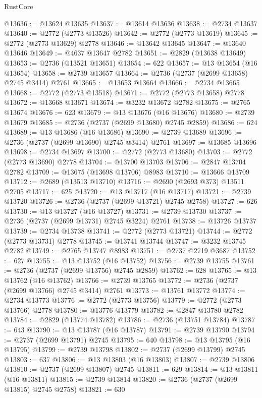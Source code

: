 \begin{lexlean}{RustCore}
\begin{coremodule}
@13636 := @13624 @13635
@13637 := @13614 @13636
@13638 := @2734 @13637
@13640 := @2772 (@2773 @13526)
@13642 := @2772 (@2773 @13619)
@13645 := @2772 (@2773 @13629) @2778
@13646 := @13642 @13645
@13647 := @13640 @13646
@13649 := @4637 @13647 @2782
@13651 := @2829 (@13638 @13649)
@13653 := @2736 (@13521 @13651)
@13654 := 622
@13657 := @13 @13654 (@16 @13654)
@13658 := @2739 @13657
@13664 := @2736 (@2737 (@2699 @13658) @2745 @3414) @2761
@13665 := @13653 @13664
@13666 := @2734 @13665
@13668 := @2772 (@2773 @13518)
@13671 := @2772 (@2773 @13658) @2778
@13672 := @13668 @13671
@13674 := @3232 @13672 @2782
@13675 := @2765 @13674
@13676 := 623
@13679 := @13 @13676 (@16 @13676)
@13680 := @2739 @13679
@13685 := @2736 (@2737 (@2699 @13680) @2745 @2859)
@13686 := 624
@13689 := @13 @13686 (@16 @13686)
@13690 := @2739 @13689
@13696 := @2736 (@2737 (@2699 @13690) @2745 @3414) @2761
@13697 := @13685 @13696
@13698 := @2734 @13697
@13700 := @2772 (@2773 @13680)
@13703 := @2772 (@2773 @13690) @2778
@13704 := @13700 @13703
@13706 := @2847 @13704 @2782
@13709 := @13675 (@13698 @13706) @8983
@13710 := @13666 @13709
@13712 := @2689 (@13513 @13710)
@13716 := @2690 (@2693 @373) @13511 @2705
@13717 := 625
@13720 := @13 @13717 (@16 @13717)
@13721 := @2739 @13720
@13726 := @2736 (@2737 (@2699 @13721) @2745 @2758)
@13727 := 626
@13730 := @13 @13727 (@16 @13727)
@13731 := @2739 @13730
@13737 := @2736 (@2737 (@2699 @13731) @2745 @3224) @2761
@13738 := @13726 @13737
@13739 := @2734 @13738
@13741 := @2772 (@2773 @13721)
@13744 := @2772 (@2773 @13731) @2778
@13745 := @13741 @13744
@13747 := @3232 @13745 @2782
@13749 := @2765 @13747 @8983
@13751 := @2737 @2719 @3687
@13752 := 627
@13755 := @13 @13752 (@16 @13752)
@13756 := @2739 @13755
@13761 := @2736 (@2737 (@2699 @13756) @2745 @2859)
@13762 := 628
@13765 := @13 @13762 (@16 @13762)
@13766 := @2739 @13765
@13772 := @2736 (@2737 (@2699 @13766) @2745 @3414) @2761
@13773 := @13761 @13772
@13774 := @2734 @13773
@13776 := @2772 (@2773 @13756)
@13779 := @2772 (@2773 @13766) @2778
@13780 := @13776 @13779
@13782 := @2847 @13780 @2782
@13784 := @2829 (@13774 @13782)
@13786 := @2736 (@13751 @13784)
@13787 := 643
@13790 := @13 @13787 (@16 @13787)
@13791 := @2739 @13790
@13794 := @2737 (@2699 @13791) @2745
@13795 := 640
@13798 := @13 @13795 (@16 @13795)
@13799 := @2739 @13798
@13802 := @2737 (@2699 @13799) @2745
@13803 := 637
@13806 := @13 @13803 (@16 @13803)
@13807 := @2739 @13806
@13810 := @2737 (@2699 @13807) @2745
@13811 := 629
@13814 := @13 @13811 (@16 @13811)
@13815 := @2739 @13814
@13820 := @2736 (@2737 (@2699 @13815) @2745 @2758)
@13821 := 630

\end{coremodule}
\end{lexlean}
